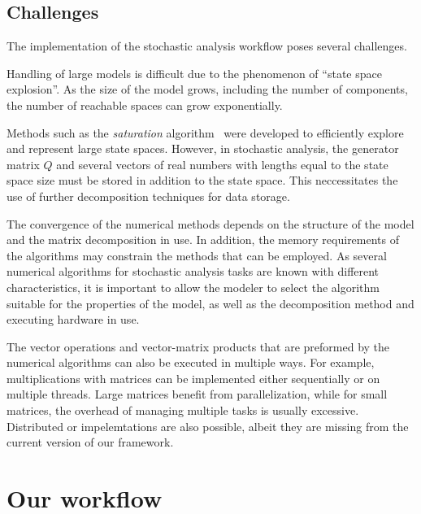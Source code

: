 \subsection{Challenges}

The implementation of the stochastic analysis workflow poses several
challenges.

Handling of large models is difficult due to the phenomenon of
\enquote{state space explosion}. As the size of the model grows,
including the number of components, the number of reachable spaces can
grow exponentially.

Methods such as the \emph{saturation} algorithm~\citep{Ciardo:2006}
were developed to efficiently explore and represent large state
spaces. However, in stochastic analysis, the generator matrix $Q$ and
several vectors of real numbers with lengths equal to the state space
size must be stored in addition to the state space. This neccessitates
the use of further decomposition techniques for data storage.

The convergence of the numerical methods depends on the structure of
the model and the matrix decomposition in use. In addition, the memory
requirements of the algorithms may constrain the methods that can be
employed. As several numerical algorithms for stochastic analysis
tasks are known with different characteristics, it is important to
allow the modeler to select the algorithm suitable for the properties
of the model, as well as the decomposition method and executing
hardware in use.

The vector operations and vector-matrix products that are preformed by
the numerical algorithms can also be executed in multiple ways. For
example, multiplications with matrices can be implemented either
sequentially or on multiple threads. Large matrices benefit from
parallelization, while for small matrices, the overhead of managing
multiple tasks is usually excessive. Distributed or 
impelemtations are also possible, albeit they are missing from the
current version of our framework.

\section{Our workflow}
  \label{chap:overview:sec:our-workflow}

